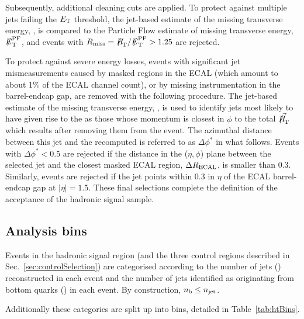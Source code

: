 Subsequently, additional cleaning cuts are applied. To protect against 
multiple jets failing the ${E_{\text T}}$ threshold, the
jet-based estimate of the missing transverse energy, \mht, is compared
to the Particle Flow estimate of missing transverse energy, $\pfmet$,
and events with $R_{\rm miss}=\mht/\pfmet > 1.25$ are rejected.

To protect against severe energy losses, events with significant jet
mismeasurements caused by masked regions in the ECAL (which amount to
about 1\% of the ECAL channel count), or by missing instrumentation in
the barrel-endcap gap, are removed with the following procedure. The
jet-based estimate of the missing transverse energy, \mht, is used to
identify jets most likely to have given rise to the \mht as those
whose momentum is closest in $\phi$ to the total $\vec{\mht}$ which
results after removing them from the event.  The azimuthal distance
between this jet and the recomputed \mht is referred to as
$\Delta\phi^*$ in what follows. Events with $\Delta\phi^* < 0.5$ are
rejected if the distance in the ($\eta,\phi$) plane between the
selected jet and the closest masked ECAL region, $\Delta R_{\rm
  ECAL}$, is smaller than 0.3. Similarly, events are rejected if the
jet points within 0.3 in $\eta$ of the ECAL barrel-endcap gap at
$|\eta| = 1.5$. These final selections complete the definition of the
acceptance of the hadronic signal sample.


\subsection{Analysis bins}

Events in the hadronic signal region (and the
three control regions described in Sec.~\ref{sec:controlSelection}) are
categorised according to the number of jets (\njet) reconstructed in
each event and the number of jets identified as originating from
bottom quarks (\nb) in each event. By construction, $n_{\text{b}} \leq n_{\text{jet}}$.

Additionally these categories are split up into \HT bins, detailed in 
Table~\ref{tab:htBins}.


